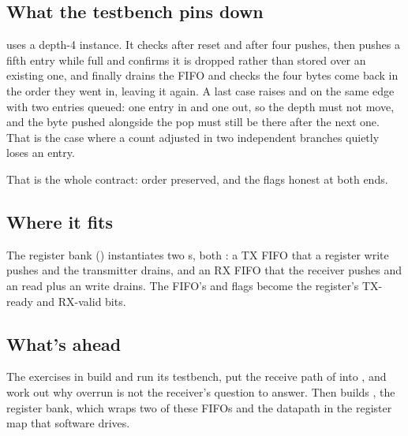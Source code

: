 \subsection{What the testbench pins down}
\label{c4:sec:fifo_tb}
 uses a depth-4 instance. It checks  after reset and  after
four pushes, then pushes a fifth entry while full and confirms it is dropped rather than stored over
an existing one, and finally drains the FIFO and checks the four bytes come back in the order they
went in, leaving it  again. A last case raises  and  on the same edge
with two entries queued: one entry in and one out, so the depth must not move, and the byte pushed
alongside the pop must still be there after the next one. That is the case where a count adjusted
in two independent branches quietly loses an entry.

That is the whole contract: order preserved, and the flags honest at both ends.

\subsection{Where it fits}
\label{c4:sec:fifo_fits}
The register bank () instantiates two s, both : a TX FIFO that a  register write pushes and the transmitter drains, and an RX FIFO
that the receiver pushes and an  read plus an  write drains. The FIFO's
 and  flags become the  register's TX-ready and RX-valid bits.

\subsection{What's ahead}
The exercises in  build  and run its testbench, put the receive
path of  into , and work out why overrun is not the receiver's question to
answer. Then  builds , the register bank, which wraps two of these
FIFOs and the datapath in the register map that software drives.
